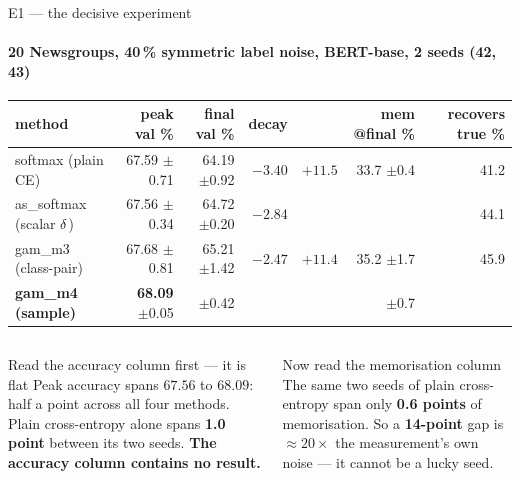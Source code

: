\begin{frame}{E1 --- the decisive experiment}
  \framesubtitle{20 Newsgroups, 40\,\% symmetric label noise, BERT-base, 2 seeds (42, 43)}
  \scriptsize
  \begin{table}\centering
  \begin{tabular}{@{}lrrrrrr@{}}
    \toprule
    method & peak val \% & final val \% & decay &  & mem @final \% & recovers true \% \\
    \midrule
    softmax (plain CE)        & 67.59 {\tiny$\pm$0.71} & 64.19 {\tiny$\pm$0.92} & $-3.40$ & $+11.5$ & 33.7 {\tiny$\pm$0.4} & 41.2 \\
    as\_softmax (scalar $\delta$) & 67.56 {\tiny$\pm$0.34} & 64.72 {\tiny$\pm$0.20} & $-2.84$ &  &  & 44.1 \\
    gam\_m3 (class-pair)      & 67.68 {\tiny$\pm$0.81} & 65.21 {\tiny$\pm$1.42} & $-2.47$ & $+11.4$ & 35.2 {\tiny$\pm$1.7} & 45.9 \\
    \textbf{gam\_m4 (sample)} & \textbf{68.09} {\tiny$\pm$0.05} &  {\tiny$\pm$0.42} &  &  &  {\tiny$\pm$0.7} &  \\
    \bottomrule
  \end{tabular}
  \end{table}
  \vspace{-0.3em}
  \begin{columns}[T]
    \begin{column}{0.49\textwidth}
      \begin{block}{Read the accuracy column first --- it is flat}
        Peak accuracy spans $67.56$ to $68.09$: half a point across all four
        methods. Plain cross-entropy alone spans \textbf{1.0 point} between its
        two seeds. \textbf{The accuracy column contains no result.}
      \end{block}
    \end{column}
    \begin{column}{0.49\textwidth}
      \begin{alertblock}{Now read the memorisation column}
        The same two seeds of plain cross-entropy span only \textbf{0.6 points}
        of memorisation. So a \textbf{14-point} gap is $\approx20\times$ the
        measurement's own noise --- it cannot be a lucky seed.
      \end{alertblock}
    \end{column}

\end{columns}
\end{frame}
